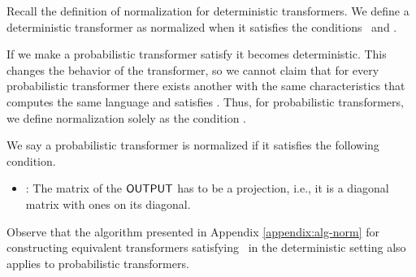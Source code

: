 Recall the definition of normalization for deterministic transformers.
We define a deterministic transformer as normalized when it satisfies the conditions \projection\ and \concentrated.

If we make a probabilistic transformer satisfy \concentrated{} it becomes deterministic.
This changes the behavior of the transformer, so we cannot claim that for every probabilistic transformer there exists another with the same characteristics that computes the same language and satisfies \concentrated.
Thus, for probabilistic transformers, we define normalization solely as the condition \projection.


\begin{definition}
    We say a probabilistic transformer is normalized if it satisfies the following condition.
    \begin{itemize}
        \item \projection : The matrix of the $\mathsf{OUTPUT}$ has to be a projection, i.e., it is a diagonal matrix with ones on its diagonal.
    \end{itemize}
\end{definition}

Observe that the algorithm presented in Appendix \ref{appendix:alg-norm} for constructing equivalent transformers satisfying \projection\ in the deterministic setting also applies to probabilistic transformers.